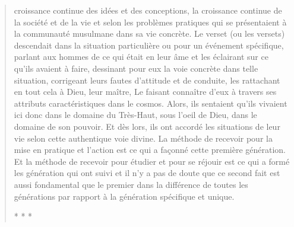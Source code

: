 \begin{quote}
croissance continue des idées et des conceptions, la croissance continue
de la société et de la vie et selon les problèmes pratiques qui se
présentaient à la communauté musulmane dans sa vie concrète. Le verset
(ou les versets) descendait dans la situation particulière ou pour un
événement spécifique, parlant aux hommes de ce qui était en leur âme et
les éclairant sur ce qu'ils avaient à faire, dessinant pour eux la voie
concrète dans telle situation, corrigeant leurs fautes d'attitude et de
conduite, les rattachant en tout cela à Dieu, leur maître, Le faisant
connaître d'eux à travers ses attributs caractéristiques dans le cosmos.
Alors, ils sentaient qu'ils vivaient ici donc dans le domaine du
Très-Haut, sous l'oeil de Dieu, dans le domaine de son pouvoir. Et dès
lors, ils ont accordé les situations de leur vie selon cette authentique
voie divine. La méthode de recevoir pour la mise en pratique et l'action
est ce qui a façonné cette première génération. Et la méthode de
recevoir pour étudier et pour se réjouir est ce qui a formé les
génération qui ont suivi et il n'y a pas de doute que ce second fait est
aussi fondamental que le premier dans la différence de toutes les
générations par rapport à la génération spécifique et unique.

* * *


\end{quote}
